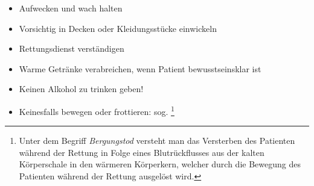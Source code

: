\label{m:ehi-unterkuehlung}
\begin{itemize}
  \item Aufwecken und wach halten
  \item Vorsichtig in Decken oder Kleidungsstücke einwickeln
  \item Rettungsdienst verständigen
  \item Warme Getränke verabreichen, wenn Patient bewusstseinsklar ist
  \item Keinen Alkohol zu trinken geben!
  \item Keinesfalls bewegen oder frottieren: sog.
  \footnote{Unter dem Begriff \emph{Bergungstod} versteht
  man das Versterben des Patienten während der Rettung in Folge eines Blutrückflusses
  aus der kalten Körperschale in den wärmeren Körperkern, welcher durch die
  Bewegung des Patienten während der Rettung ausgelöst wird.}
\end{itemize}